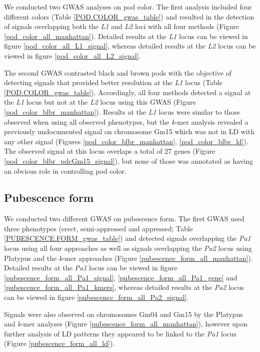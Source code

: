 We conducted two GWAS analyses on pod color. The first analysis included four
different colors (Table \ref{POD.COLOR_gwas_table}) and resulted in the
detection of signals overlapping both the \emph{L1} and \emph{L2} loci with all
four methods (Figure \ref{pod_color_all_manhattan}). Detailed results at the
\textit{L1} locus can be viewed in figure \ref{pod_color_all_L1_signal},
whereas detailed results at the \textit{L2} locus can be viewed in figure
\ref{pod_color_all_L2_signal}.

The second GWAS contrasted black and brown pods with the objective of detecting
signals that provided better resolution at the \emph{L1} locus (Table
\ref{POD.COLOR_gwas_table}).  Accordingly, all four methods detected a signal
at the \emph{L1} locus but not at the \emph{L2} locus using this GWAS (Figure
\ref{pod_color_blbr_manhattan}).  Results at the \emph{L1} locus were similar
to those observed when using all observed phenotypes, but the \emph{k}-mer
analysis revealed a previously undocumented signal on chromosome Gm15 which was
not in LD with any other signal (Figures \ref{pod_color_blbr_manhattan},
\ref{pod_color_blbr_ld}). The observed signal at this locus overlaps a total of
27 genes (Figure \ref{pod_color_blbr_pdcGm15_signal}), but none of those was
annotated as having an obvious role in controlling pod color.

\subsection*{Pubescence form}
\label{sv-gwas-pubesence-form}

We conducted two different GWAS on pubescence form. The first GWAS used three
phenotypes (erect, semi-appressed and appressed; Table
\ref{PUBESCENCE.FORM_gwas_table}) and detected signals overlapping the
\emph{Pa1} locus using all four approaches as well as signals overlapping the
\emph{Pa2} locus using Platypus and the \emph{k}-mer approaches (Figure
\ref{pubescence_form_all_manhattan}). Detailed results at the \textit{Pa1} locus
can be viewed in figure \ref{pubescence_form_all_Pa1_signal},
\ref{pubescence_form_all_Pa1_gene} and \ref{pubescence_form_all_Pa1_kmers},
whereas detailed results at the \textit{Pa2} locus can be viewed in figure
\ref{pubescence_form_all_Pa2_signal}.

Signals were also observed on chromosomes Gm04 and Gm15 by the Platypus and
\emph{k}-mer analyses (Figure \ref{pubescence_form_all_manhattan}), however
upon further analysis of LD patterns they appeared to be linked to the
\emph{Pa1} locus (Figure \ref{pubescence_form_all_ld}).


